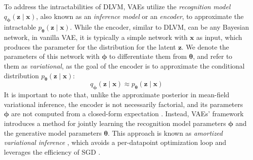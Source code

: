To address the intractabilities of DLVM, VAEs utilize the \textit{recognition model} $q_{\boldsymbol{\phi}}(\mathbf{z}\mid \mathbf{x})$, also known as an 
\textit{inference model} or an \textit{encoder}, to approximate the intractable $p_{\boldsymbol{\theta}}(\mathbf{z}\mid \mathbf{x})$. 
While the encoder, similar 
to DLVM, can be any Bayesian network, in vanilla VAE, it is typically a simple network with $\mathbf{x}$ as input, which produces the parameter for
the distribution for the latent $\mathbf{z}$. We denote the parameters of this network with ${\boldsymbol{\phi}}$ to differentiate them from ${\boldsymbol{\theta}}$, and refer
to them as \textit{variational}, as the goal of the encoder is to approximate the conditional distribution $p_{\boldsymbol{\theta}}(\mathbf{z}\mid \mathbf{x})$:
$$
q_{\boldsymbol{\phi}}(\mathbf{z}\mid \mathbf{x}) \approx p_{\boldsymbol{\theta}}(\mathbf{z}\mid \mathbf{x})
$$
It is important to note that, unlike the approximate posterior in mean-field variational inference, the encoder is not necessarily factorial, and
its parameters ${\boldsymbol{\phi}}$ are not computed from a closed-form expectation \cite{vae-original-2013}. Instead, VAEs' framework introduces a method for 
jointly learning the recognition model parameters ${\boldsymbol{\phi}}$ and the generative model parameters ${\boldsymbol{\theta}}$.  This approach is known as \textit{amortized 
variational inference} \cite{amortized-inference-2014}, which avoids a per-datapoint optimization loop and leverages the efficiency of SGD \cite{intro-vae-2019}.
